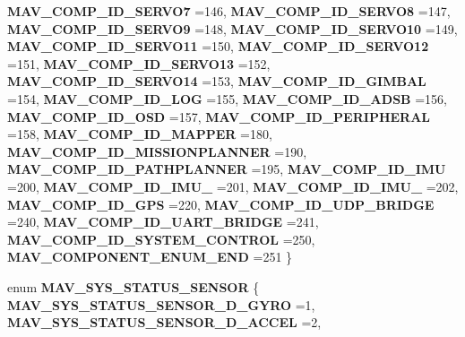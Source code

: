 \begin{DoxyCompactItemize}
\newline
\textbf{ M\+A\+V\+\_\+\+C\+O\+M\+P\+\_\+\+I\+D\+\_\+\+S\+E\+R\+V\+O7} =146, 
\textbf{ M\+A\+V\+\_\+\+C\+O\+M\+P\+\_\+\+I\+D\+\_\+\+S\+E\+R\+V\+O8} =147, 
\textbf{ M\+A\+V\+\_\+\+C\+O\+M\+P\+\_\+\+I\+D\+\_\+\+S\+E\+R\+V\+O9} =148, 
\textbf{ M\+A\+V\+\_\+\+C\+O\+M\+P\+\_\+\+I\+D\+\_\+\+S\+E\+R\+V\+O10} =149, 
\newline
\textbf{ M\+A\+V\+\_\+\+C\+O\+M\+P\+\_\+\+I\+D\+\_\+\+S\+E\+R\+V\+O11} =150, 
\textbf{ M\+A\+V\+\_\+\+C\+O\+M\+P\+\_\+\+I\+D\+\_\+\+S\+E\+R\+V\+O12} =151, 
\textbf{ M\+A\+V\+\_\+\+C\+O\+M\+P\+\_\+\+I\+D\+\_\+\+S\+E\+R\+V\+O13} =152, 
\textbf{ M\+A\+V\+\_\+\+C\+O\+M\+P\+\_\+\+I\+D\+\_\+\+S\+E\+R\+V\+O14} =153, 
\newline
\textbf{ M\+A\+V\+\_\+\+C\+O\+M\+P\+\_\+\+I\+D\+\_\+\+G\+I\+M\+B\+AL} =154, 
\textbf{ M\+A\+V\+\_\+\+C\+O\+M\+P\+\_\+\+I\+D\+\_\+\+L\+OG} =155, 
\textbf{ M\+A\+V\+\_\+\+C\+O\+M\+P\+\_\+\+I\+D\+\_\+\+A\+D\+SB} =156, 
\textbf{ M\+A\+V\+\_\+\+C\+O\+M\+P\+\_\+\+I\+D\+\_\+\+O\+SD} =157, 
\newline
\textbf{ M\+A\+V\+\_\+\+C\+O\+M\+P\+\_\+\+I\+D\+\_\+\+P\+E\+R\+I\+P\+H\+E\+R\+AL} =158, 
\textbf{ M\+A\+V\+\_\+\+C\+O\+M\+P\+\_\+\+I\+D\+\_\+\+M\+A\+P\+P\+ER} =180, 
\textbf{ M\+A\+V\+\_\+\+C\+O\+M\+P\+\_\+\+I\+D\+\_\+\+M\+I\+S\+S\+I\+O\+N\+P\+L\+A\+N\+N\+ER} =190, 
\textbf{ M\+A\+V\+\_\+\+C\+O\+M\+P\+\_\+\+I\+D\+\_\+\+P\+A\+T\+H\+P\+L\+A\+N\+N\+ER} =195, 
\newline
\textbf{ M\+A\+V\+\_\+\+C\+O\+M\+P\+\_\+\+I\+D\+\_\+\+I\+MU} =200, 
\textbf{ M\+A\+V\+\_\+\+C\+O\+M\+P\+\_\+\+I\+D\+\_\+\+I\+M\+U\+\_} =201, 
\textbf{ M\+A\+V\+\_\+\+C\+O\+M\+P\+\_\+\+I\+D\+\_\+\+I\+M\+U\+\_} =202, 
\textbf{ M\+A\+V\+\_\+\+C\+O\+M\+P\+\_\+\+I\+D\+\_\+\+G\+PS} =220, 
\newline
\textbf{ M\+A\+V\+\_\+\+C\+O\+M\+P\+\_\+\+I\+D\+\_\+\+U\+D\+P\+\_\+\+B\+R\+I\+D\+GE} =240, 
\textbf{ M\+A\+V\+\_\+\+C\+O\+M\+P\+\_\+\+I\+D\+\_\+\+U\+A\+R\+T\+\_\+\+B\+R\+I\+D\+GE} =241, 
\textbf{ M\+A\+V\+\_\+\+C\+O\+M\+P\+\_\+\+I\+D\+\_\+\+S\+Y\+S\+T\+E\+M\+\_\+\+C\+O\+N\+T\+R\+OL} =250, 
\textbf{ M\+A\+V\+\_\+\+C\+O\+M\+P\+O\+N\+E\+N\+T\+\_\+\+E\+N\+U\+M\+\_\+\+E\+ND} =251
 \}
\item 
enum \textbf{ M\+A\+V\+\_\+\+S\+Y\+S\+\_\+\+S\+T\+A\+T\+U\+S\+\_\+\+S\+E\+N\+S\+OR} \{ \newline
\textbf{ M\+A\+V\+\_\+\+S\+Y\+S\+\_\+\+S\+T\+A\+T\+U\+S\+\_\+\+S\+E\+N\+S\+O\+R\+\_\+D\+\_\+\+G\+Y\+RO} =1, 
\textbf{ M\+A\+V\+\_\+\+S\+Y\+S\+\_\+\+S\+T\+A\+T\+U\+S\+\_\+\+S\+E\+N\+S\+O\+R\+\_\+D\+\_\+\+A\+C\+C\+EL} =2, 

\end{DoxyCompactItemize}

